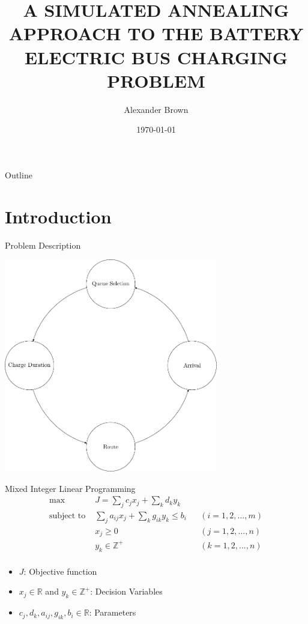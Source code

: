 \documentclass[aspectratio=169]{beamer}
\institute[USU] %
{
College of Engineering\\
Utah State University
}
\author{Alexander Brown}
\date{\today}
\title{A SIMULATED ANNEALING APPROACH TO THE BATTERY ELECTRIC BUS CHARGING PROBLEM}
\begin{document}
\maketitle
\begin{frame}{Outline}
\tableofcontents
\end{frame}


\section{Introduction}
\label{sec:orgb5e108c}
\begin{frame}[label={sec:orgc63d93c}]{Problem Description}
\begin{center}
\includegraphics[width=0.7\textwidth]{./img/visit.pdf}
\end{center}
\end{frame}

\begin{frame}[label={sec:orgb90209d}]{Mixed Integer Linear Programming}
\begin{align*}
\text{max }        &J = \sum_j c_j x_j + \sum_k d_k y_k&         &               \\
\text{subject to } &\sum_j a_{ij} x_j + \sum_k g_{ik} y_k \le b_i&  &(i = 1,2,...,m)\\
                  &x_j \ge 0&                              &(j = 1,2,...,n)\\
                  &y_k \in \mathbb{Z^+}&                   &(k = 1,2,...,n)\\
\end{align*}

\begin{itemize}
\item \(J\): Objective function
\item \(x_j \in \mathbb{R}\) and \(y_k \in \mathbb{Z}^+\): Decision Variables
\item \(c_j, d_k, a_{ij}, g_{ik}, b_i \in \mathbb{R}\): Parameters
\end{itemize}
\end{frame}
\end{document}
